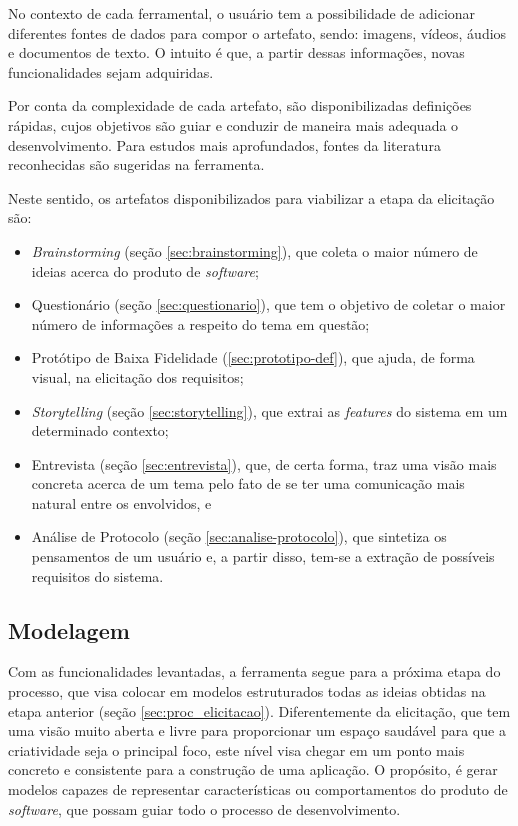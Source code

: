 No contexto de cada ferramental, o usuário tem a possibilidade de adicionar diferentes fontes de dados para compor o artefato, sendo: imagens, vídeos, áudios e documentos de texto. O intuito é que, a partir dessas informações, novas funcionalidades sejam adquiridas.

Por conta da complexidade de cada artefato, são disponibilizadas definições rápidas, cujos objetivos são guiar e conduzir de maneira mais adequada o desenvolvimento. Para estudos mais aprofundados, fontes da literatura reconhecidas são sugeridas na ferramenta.

Neste sentido, os artefatos disponibilizados para viabilizar a etapa da elicitação são:

\begin{itemize}
    \item \textit{Brainstorming} (seção \ref{sec:brainstorming}), que coleta o maior número de ideias acerca do produto de \textit{software};
    \item Questionário (seção \ref{sec:questionario}), que tem o objetivo de coletar o maior número de informações a respeito do tema em questão;
    \item Protótipo de Baixa Fidelidade (\ref{sec:prototipo-def}), que ajuda, de forma visual, na elicitação dos requisitos;
    \item \textit{Storytelling} (seção \ref{sec:storytelling}), que extrai as \textit{features} do sistema em um determinado contexto;
    \item Entrevista (seção \ref{sec:entrevista}), que, de certa forma, traz uma visão mais concreta acerca de um tema pelo fato de se ter uma comunicação mais natural entre os envolvidos, e
    \item Análise de Protocolo (seção \ref{sec:analise-protocolo}), que sintetiza os pensamentos de um usuário e, a partir disso, tem-se a extração de possíveis requisitos do sistema.
\end{itemize}

\subsection{Modelagem}

Com as funcionalidades levantadas, a ferramenta segue para a próxima etapa do processo, que visa colocar em modelos estruturados todas as ideias obtidas na etapa anterior (seção \ref{sec:proc_elicitacao}). Diferentemente da elicitação, que tem uma visão muito aberta e livre para proporcionar um espaço saudável para que a criatividade seja o principal foco, este nível visa chegar em um ponto mais concreto e consistente para a construção de uma aplicação. O propósito, é gerar modelos capazes de representar características ou comportamentos do produto de \textit{software}, que possam guiar todo o processo de desenvolvimento.

